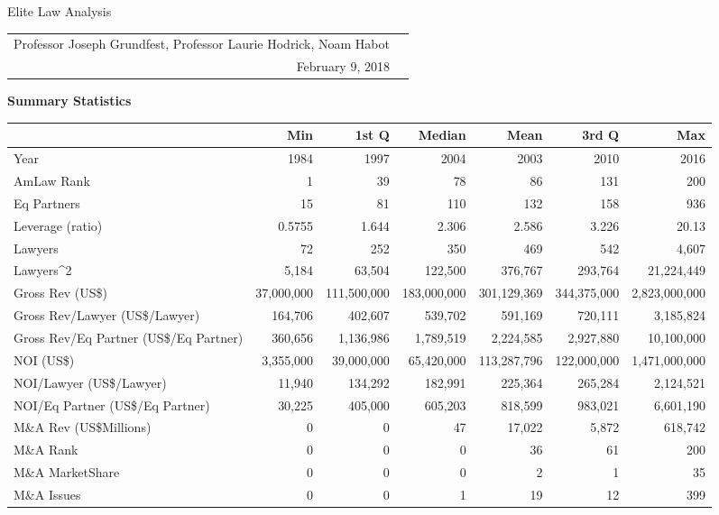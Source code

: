 \documentclass{article}
\begin{document}
\begin{center}{\LARGE Elite Law Analysis}
\\
\begin{tabular}{rl}\\Professor Joseph Grundfest, Professor Laurie Hodrick, Noam Habot \\February 9, 2018\end{tabular}\end{center}{\large \textbf{Summary Statistics} }%
\begin{table}[H]
\centering
\begin{tabular}{lrrrrrr}
  \hline
 & Min & 1st Q & Median & Mean & 3rd Q & Max \\ 
  \hline
Year & 1984 & 1997 & 2004 & 2003 & 2010 & 2016 \\ 
  AmLaw Rank & 1 & 39 & 78 & 86 & 131 & 200 \\ 
  Eq Partners & 15 & 81 & 110 & 132 & 158 & 936 \\ 
  Leverage (ratio) & 0.5755 & 1.644 & 2.306 & 2.586 & 3.226 & 20.13 \\ 
  Lawyers & 72 & 252 & 350 & 469 & 542 & 4,607 \\ 
  Lawyers^2 & 5,184 & 63,504 & 122,500 & 376,767 & 293,764 & 21,224,449 \\ 
  Gross Rev (US\$) & 37,000,000 & 111,500,000 & 183,000,000 & 301,129,369 & 344,375,000 & 2,823,000,000 \\ 
  Gross Rev/Lawyer (US\$/Lawyer) & 164,706 & 402,607 & 539,702 & 591,169 & 720,111 & 3,185,824 \\ 
  Gross Rev/Eq Partner (US\$/Eq Partner) & 360,656 & 1,136,986 & 1,789,519 & 2,224,585 & 2,927,880 & 10,100,000 \\ 
  NOI (US\$) & 3,355,000 & 39,000,000 & 65,420,000 & 113,287,796 & 122,000,000 & 1,471,000,000 \\ 
  NOI/Lawyer (US\$/Lawyer) & 11,940 & 134,292 & 182,991 & 225,364 & 265,284 & 2,124,521 \\ 
  NOI/Eq Partner (US\$/Eq Partner) & 30,225 & 405,000 & 605,203 & 818,599 & 983,021 & 6,601,190 \\ 
  M\&A Rev (US\$Millions) & 0 & 0 & 47 & 17,022 & 5,872 & 618,742 \\ 
  M\&A  Rank & 0 & 0 & 0 & 36 & 61 & 200 \\ 
  M\&A MarketShare & 0 & 0 & 0 & 2 & 1 & 35 \\ 
  M\&A Issues & 0 & 0 & 1 & 19 & 12 & 399 \\ 

\end{tabular}
\end{table}
\end{document}
